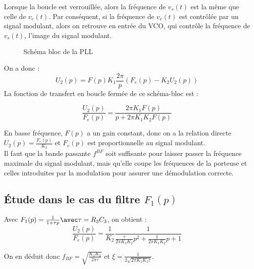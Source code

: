 \documentclass[../../Cours_M1.tex]{subfiles}
\begin{document}
Lorsque la boucle est verrouillée, alors la fréquence  de $v_s(t)$ est la même que celle de $v_e(t)$. Par conséquent, si la fréquence de $v_e(t)$ est contrôlée par un signal modulant, alors on retrouve en entrée du VCO, qui contrôle la fréquence de $v_s(t)$, l'image du signal modulant.

\begin{figure}[h!]
\centering
{}
\caption{Schéma bloc de la PLL}
\end{figure}
On a donc :
\[ U_2(p) = F(p)K_1\frac{2\pi}{p}(F_e(p) - K_2U_2(p)) \]
La fonction de transfert en boucle fermée de ce schéma-bloc est :

\[ \frac{U_2(p)}{F_e(p)} =  \frac{2\pi K_1F(p)}{p+2\pi K_1K_2 F(p)} \]

En basse fréquence, $F(p)$ a un gain constant, donc on a la relation directe $U_2(p) = \frac{F_e(p)}{K_2}$ et $F_e(p)$ est proportionnelle au signal modulant.\\

Il faut que la bande passante $f^{BF}$ soit suffisante pour laisser passer la fréquence maximale du signal modulant, mais qu'elle coupe les fréquences de la porteuse et celles introduites par la modulation pour assurer une démodulation correcte.

\subsection{Étude dans le cas du filtre $F_1(p)$}
Avec $F_1(p)=\frac{1}{1+\tau p} \avec \tau = R_3C_3$, on obtient :
\[ \frac{U_2(p)}{F_e(p)} = \frac{1}{K_2}\frac{1}{\frac{\tau}{2\pi K_1 K_2}p^2 + \frac{1}{2\pi K_1 K_2}p +1}\]

On en déduit donc $f_{BF} = \sqrt{\frac{K_1 K_2}{2\pi \tau}}$ et $\xi = \frac{1}{2\sqrt{2\pi K_1 K_2 \tau}}$. 
\end{document}
